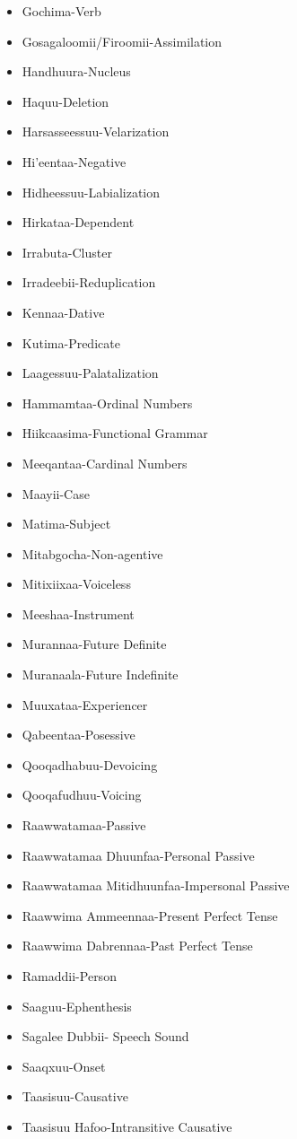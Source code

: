 \documentclass[11pt,b5paper]{book}
\begin{document}
\begin{itemize}
	\item Gochima-Verb
	\item Gosagaloomii/Firoomii-Assimilation
	\item Handhuura-Nucleus
	\item Haquu-Deletion
	\item Harsasseessuu-Velarization
	\item Hi'eentaa-Negative
	\item Hidheessuu-Labialization
	\item Hirkataa-Dependent
	\item Irrabuta-Cluster
	\item Irradeebii-Reduplication
	\item Kennaa-Dative
	\item Kutima-Predicate
	\item Laagessuu-Palatalization
	\item Hammamtaa-Ordinal Numbers
	\item Hiikcaasima-Functional Grammar
	\item Meeqantaa-Cardinal Numbers
	\item Maayii-Case
	\item Matima-Subject
	\item Mitabgocha-Non-agentive
	\item Mitixiixaa-Voiceless
	\item Meeshaa-Instrument
	\item Murannaa-Future Definite
	\item Muranaala-Future Indefinite
	\item Muuxataa-Experiencer
	\item Qabeentaa-Posessive
	\item Qooqadhabuu-Devoicing
	\item Qooqafudhuu-Voicing
	\item Raawwatamaa-Passive
	\item Raawwatamaa Dhuunfaa-Personal Passive
	\item Raawwatamaa Mitidhuunfaa-Impersonal Passive
	\item Raawwima Ammeennaa-Present Perfect Tense
	\item Raawwima Dabrennaa-Past Perfect Tense
	\item Ramaddii-Person
	\item Saaguu-Ephenthesis
	\item Sagalee Dubbii- Speech Sound
	\item Saaqxuu-Onset
	\item Taasisuu-Causative
	\item Taasisuu Hafoo-Intransitive Causative

\end{itemize}
\end{document}
